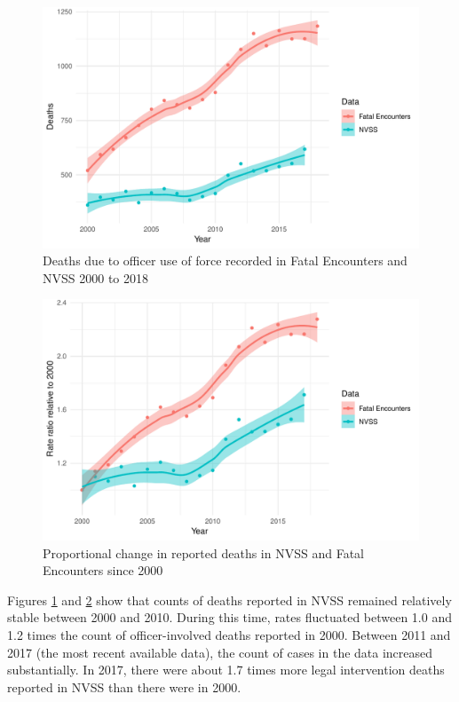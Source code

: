 \documentclass{article}
\begin{document}
\begin{figure}
	\centering
	\includegraphics[width = \linewidth]{vis/nvss_fe_ts.pdf}
	\caption{Deaths due to officer use of force recorded in Fatal Encounters and NVSS 2000 to 2018}
	\label{fig:countTS}
\end{figure}

\begin{figure}
	\centering
	\includegraphics[width = \linewidth]{vis/nvss_fe_pct.pdf}
	\caption{Proportional change in reported deaths in NVSS and Fatal Encounters since 2000}
	\label{fig:pctTS}
\end{figure}

Figures \ref{fig:countTS} and \ref{fig:pctTS} show that counts of deaths reported in NVSS remained relatively stable between 2000 and 2010. During this time, rates fluctuated between 1.0 and 1.2 times the count of officer-involved deaths reported in 2000. Between 2011 and 2017 (the most recent available data), the count of cases in the data increased substantially. In 2017, there were about 1.7 times more legal intervention deaths reported in NVSS than there were in 2000. 
\end{document}
